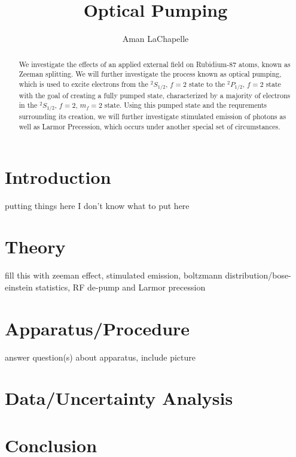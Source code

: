 \documentclass{article}
\title{Optical Pumping}
\author{Aman LaChapelle}
\begin{document}
\raggedright
\maketitle

\begin{abstract}
  We investigate the effects of an applied external field on Rubidium-87 atoms, known as Zeeman splitting.  We will further investigate the process known as optical pumping, which is used to excite electrons from the $^2S_{1/2},\, f = 2$ state to the $^2P_{1/2},\, f = 2$ state with the goal of creating a fully pumped state, characterized by a majority of electrons in the $^2S_{1/2},\, f = 2,\, m_f = 2$ state.  Using this pumped state and the requrements surrounding its creation, we will further investigate stimulated emission of photons as well as Larmor Precession, which occurs under another special set of circumstances.
\end{abstract}

\tableofcontents
\newpage

\section{Introduction}%
  putting things here I don't know what to put here
\section{Theory}%
  fill this with zeeman effect, stimulated emission, boltzmann distribution/bose-einstein statistics, RF de-pump and Larmor precession
\section{Apparatus/Procedure}%
  answer question(s) about apparatus, include picture
\section{Data/Uncertainty Analysis}%

\section{Conclusion}%

\begin{thebibliography}


\end{thebibliography}
\end{document}
